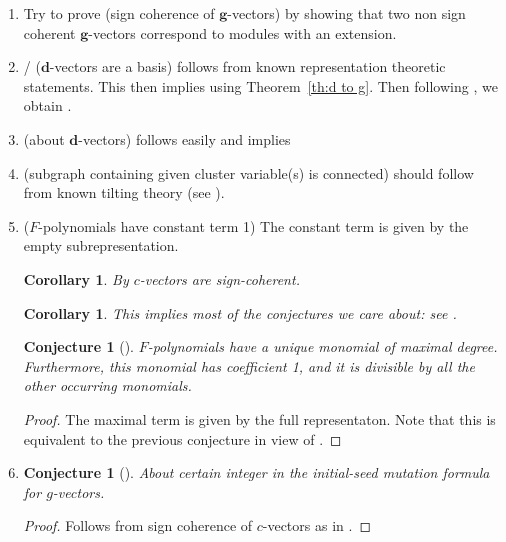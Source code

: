 \documentclass[12pt]{amsart}
\newtheorem{corollary}[theorem]{Corollary}
\newtheorem{conjecture}[theorem]{Conjecture}
\newcommand{\bfd}{\mathbf{d}}
\newcommand{\bfg}{\mathbf{g}}
\begin{document}
  \begin{enumerate}
    \item
      Try to prove \cite[Conj. 6.13]{fomin-zelevinsky4} (sign coherence of $\bfg$-vectors) by showing that two non sign coherent $\bfg$-vectors correspond to modules with an extension.
    \item
      \cite[Con. 7.6]{fomin-zelevinsky4}/\cite[Conj. 3.22]{reading-speyer} ($\bfd$-vectors are a basis) follows from known representation theoretic statements.
      This then implies \cite[Conj. 7.10]{fomin-zelevinsky4} using Theorem~\ref{th:d to g}.
      Then following \cite[Rem. 7.11]{fomin-zelevinsky4}, we obtain \cite[Con. 7.2]{fomin-zelevinsky4}.
    
    \item
      \cite[Conj. 7.4]{fomin-zelevinsky4} (about $\bfd$-vectors) follows easily and implies \cite[Conj. 7.5]{fomin-zelevinsky4}

    \item
      \cite[Conj. 3.9, 3.10]{reading-speyer} (subgraph containing given cluster variable(s) is connected)  should follow from known tilting theory (see \cite[Cor. 3]{caldero-keller2}).

    \item
      \cite[Conjecture 5.4]{fomin-zelevinsky4} ($F$-polynomials have constant term 1)
      The constant term is given by the empty subrepresentation.
      \begin{corollary}
        By \cite[Proposition 5.6]{fomin-zelevinsky4} $c$-vectors are sign-coherent.
      \end{corollary}
      \begin{corollary}
        This implies most of the conjectures we care about: see \cite[Proposition 4.2]{NZ12}.
      \end{corollary}
      \begin{conjecture}[{\cite[Conjecture 5.5]{fomin-zelevinsky4}}]
        $F$-polynomials have  a unique monomial of maximal degree. 
        Furthermore, this monomial has coefficient 1, and it is divisible by all the other occurring monomials.
      \end{conjecture}
      \begin{proof}
        The maximal term is given by the full representaton.
        Note that this is equivalent to the previous conjecture in view of \cite[Proposition 5.3]{fomin-zelevinsky4}.
      \end{proof}

    \item
      \begin{conjecture}[{\cite[Conjecture 6.10]{fomin-zelevinsky4}}]
        About certain integer in the initial-seed mutation formula for $g$-vectors.
      \end{conjecture}
      \begin{proof}
        Follows from sign coherence of $c$-vectors as in \cite[Proposition 4.2]{NZ12}.
      \end{proof}


\end{enumerate}
\end{document}
